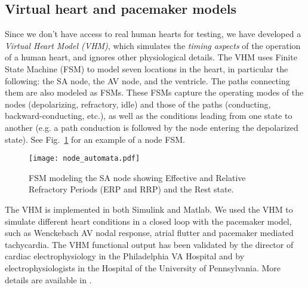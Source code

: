\subsection{Virtual heart and pacemaker models}
\label{heartmodel}

Since we don't have access to real human hearts for testing, we have developed a \emph{Virtual Heart Model (VHM)}, which simulates the \emph{timing aspects} of the operation of a human heart, and ignores other physiological details.
The VHM uses Finite State Machine (FSM) to model seven locations in the heart, in particular the following: the SA node, the AV node, and the ventricle.
The paths connecting them are also modeled as FSMs.
These FSMs capture the operating modes of the nodes (depolarizing, refractory, idle) and those of the paths (conducting, backward-conducting, etc.), as well as the conditions leading from one state to another (e.g. a path conduction is followed by the node entering the depolarized state).
See Fig.~\ref{fig:FSMSA} for an example of a node FSM.
\begin{figure}[t]
\centering
\texttt{[image: node\_automata.pdf]}
\caption{FSM modeling the SA node showing Effective and Relative Refractory Periods (ERP and RRP) and the Rest state.}
\label{fig:FSMSA}
\end{figure}
The VHM is implemented in both Simulink and Matlab. 
We used the VHM to simulate different heart conditions in a closed loop with the pacemaker model, such as Wenckebach AV nodal response, atrial flutter and pacemaker mediated tachycardia.
The VHM functional output has been validated by the director of cardiac electrophysiology in the Philadelphia VA Hospital and by electrophysiologists in the Hospital of the University of Pennsylvania. 
More details are available in \cite{VHM_proc}.

